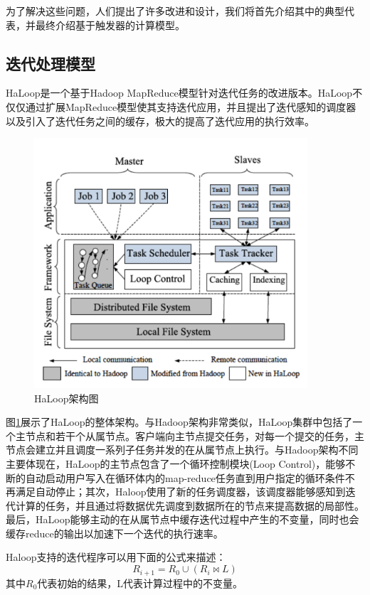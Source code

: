 为了解决这些问题，人们提出了许多改进和设计，我们将首先介绍其中的典型代表，并最终介绍基于触发器的计算模型。

\subsection{迭代处理模型}

HaLoop\cite{bu2010haloop}是一个基于Hadoop MapReduce模型针对迭代任务的改进版本。HaLoop不仅仅通过扩展MapReduce模型使其支持迭代应用，并且提出了迭代感知的调度器以及引入了迭代任务之间的缓存，极大的提高了迭代应用的执行效率。

\begin{figure}[h!]
\centering
\includegraphics[width=4in]{../figures/haloop.pdf}
\caption{HaLoop架构图}
\label{fig:haloop}
\end{figure}

图\ref{fig:haloop}展示了HaLoop的整体架构。与Hadoop架构非常类似，HaLoop集群中包括了一个主节点和若干个从属节点。客户端向主节点提交任务，对每一个提交的任务，主节点会建立并且调度一系列子任务并发的在从属节点上执行。与Hadoop架构不同主要体现在，HaLoop的主节点包含了一个循环控制模块(Loop Control)，能够不断的自动启动用户写入在循环体内的map-reduce任务直到用户指定的循环条件不再满足自动停止；其次，Haloop使用了新的任务调度器，该调度器能够感知到迭代计算的任务，并且通过将数据优先调度到数据所在的节点来提高数据的局部性。最后，HaLoop能够主动的在从属节点中缓存迭代过程中产生的不变量，同时也会缓存reduce的输出以加速下一个迭代的执行速率。

Haloop支持的迭代程序可以用下面的公式来描述：
\begin{equation}
R_{i+1}=R_0 \cup (R_i \bowtie L)
\end{equation}
其中$R_0$代表初始的结果，L代表计算过程中的不变量。

